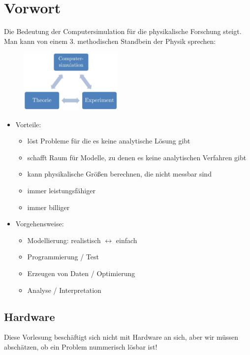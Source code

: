 \documentclass[12pt]{article}
\begin{document}
\tableofcontents
\newpage

\section{Vorwort}
Die Bedeutung der Computersimulation für die physikalische Forschung steigt. Man kann von einem 3. methodischen Standbein der Physik sprechen: 
\begin{figure}[ht]
	\centering
  \includegraphics[width=0.45\textwidth]{Null_DrittesStandbein.jpg}
	\label{Null_DrittesStandbein}
\end{figure}
\begin{itemize}
\item Vorteile:

\begin{itemize}
\item löst Probleme für die es keine analytische Lösung gibt
\item schafft Raum für Modelle, zu denen es keine analytischen Verfahren gibt
\item kann physikalische Größen berechnen, die nicht messbar sind 
\item immer leistungsfähiger
\item immer billiger
\end{itemize}


\item Vorgehensweise:

\begin{itemize}
\item Modellierung: realistisch $\longleftrightarrow$ einfach
\item Programmierung / Test
\item Erzeugen von Daten / Optimierung
\item Analyse / Interpretation
\end{itemize}
\end{itemize}

\subsection{Hardware}
Diese Vorlesung beschäftigt sich nicht mit Hardware an sich, aber wir müssen abschätzen, ob ein Problem nummerisch lösbar ist! 
\end{document}
